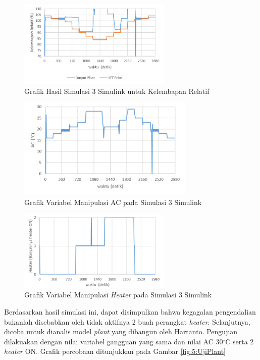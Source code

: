 \begin{figure}[!h]
	\centering
	\includegraphics[width=0.65\textwidth]{figures/Simulink3RH}
	\caption{Grafik Hasil Simulasi 3 Simulink untuk Kelembapan Relatif}
	\label{fig:5:Simulink3RH}
\end{figure}

\begin{figure}[!h]
	\centering
	\includegraphics[width=0.75\textwidth]{figures/Simulink3AC}
	\caption{Grafik Variabel Manipulasi AC pada Simulasi 3 Simulink}
	\label{fig:5:Simulink3AC}
\end{figure}

\begin{figure}[!h]
	\centering
	\includegraphics[width=0.65\textwidth]{figures/Simulink3HT}
	\caption{Grafik Variabel Manipulasi \textit{Heater} pada Simulasi 3 Simulink}
	\label{fig:5:Simulink3HT}
\end{figure}

Berdasarkan hasil simulasi ini, dapat disimpulkan bahwa kegagalan pengendalian bukanlah disebabkan oleh tidak aktifnya 2 buah perangkat \textit{heater}. Selanjutnya, dicoba untuk dianalis model \textit{plant} yang dibangun oleh Hartanto. Pengujian dilakuakan dengan nilai variabel gangguan yang sama dan nilai AC 30$^\circ$C serta 2 \textit{heater} ON. Grafik percobaan ditunjukkan pada Gambar \ref{fig:5:UjiPlant}\\
\break
\break
\break

